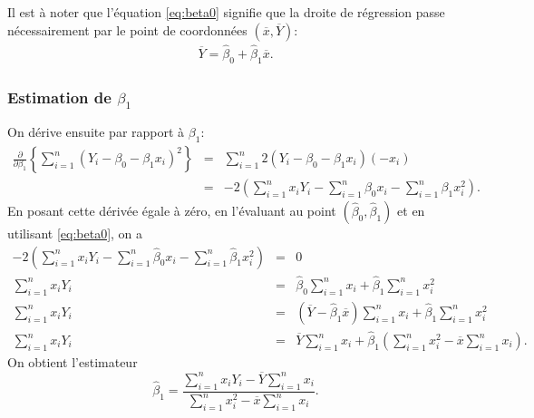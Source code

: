 \begin{remarque}
 Il est à noter que l'équation \eqref{eq:beta0} signifie que la droite de régression passe nécessairement par le point de coordonnées $(\overline{x},\overline{Y})$:
\begin{eqnarray}
\overline{Y} = \widehat\beta_0+ \widehat\beta_1 \overline{x}.
 \label{eq:dbeta0egal0}
\end{eqnarray}
\end{remarque}

\subsubsection*{Estimation de $\beta_1$}

On dérive ensuite par rapport à $\beta_1$:
\begin{eqnarray*}
 \frac{\partial}{\partial \beta_1} \left\{\sum_{i=1}^n (Y_i - \beta_0 - \beta_1 x_i)^2\right\} &=& \sum_{i=1}^n 2(Y_i - \beta_0 - \beta_1 x_i)(-x_i)\\
 &=& -2 \left(\sum_{i=1}^n x_i Y_i - \sum_{i=1}^n  \beta_0 x_i - \sum_{i=1}^n  \beta_1 x_i^2 \right).
\end{eqnarray*}
En posant cette dérivée égale à zéro, en l'évaluant au point $\left(\widehat\beta_0, \widehat\beta_1 \right)$ et en utilisant  \eqref{eq:beta0}, on a
\begin{eqnarray*}
-2 \left( \sum_{i=1}^n x_i Y_i - \sum_{i=1}^n  \widehat\beta_0 x_i - \sum_{i=1}^n  \widehat\beta_1 x_i^2\right) & = & 0 \\
\sum_{i=1}^n x_i Y_i &= & \widehat\beta_0 \sum_{i=1}^n x_i + \widehat\beta_1 \sum_{i=1}^nx_i^2 \\
\sum_{i=1}^n x_i Y_i & = & (\overline{Y}-\widehat\beta_1 \overline{x}) \sum_{i=1}^n x_i + \widehat\beta_1 \sum_{i=1}^nx_i^2 \\
\sum_{i=1}^n x_i Y_i & = & \overline{Y} \sum_{i=1}^n x_i + \widehat\beta_1 \left(\sum_{i=1}^n x_i^2 - \overline{x}\sum_{i=1}^n x_i \right).
\end{eqnarray*}
On obtient l'estimateur 
\begin{equation}
\label{eq:beta1chapeau}
\widehat{\beta}_1 = \frac{\sum\limits_{i=1}^n x_i Y_i -\overline{Y} \sum\limits_{i=1}^n x_i}{\sum\limits_{i=1}^n x_i^2 - \overline{x}\sum\limits_{i=1}^n x_i}.
\end{equation}


